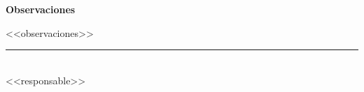 \documentclass[11pt,a4paper]{article}
\begin{document}
\vspace{5mm}
{\Large\textbf{Observaciones}}

<<observaciones>>

\vfill
\begin{center}
  \rule{7cm}{0.4pt}\\
  <<responsable>>
\end{center}
\end{document}

